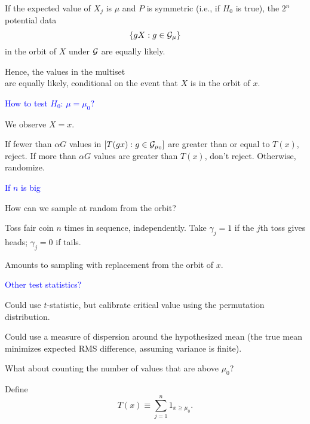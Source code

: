 \documentclass[landscape]{slides}
\newcommand{\cG}{{\cal G}}
\newcommand{\beq}{\begin{equation}}
\newcommand{\eeq}{\end{equation}}
\begin{document}
\begin{slide}

If the expected value of $X_j$ is $\mu$ and $P$ is symmetric (i.e., if $H_0$
is true), 
the $2^n$ potential data
\beq
   \{ gX : g \in \cG_\mu \}
\eeq
in the orbit of $X$ under $\cG$ are equally likely.

Hence, the values in the multiset
\beq
   [ T(gx) : g \in \cG_\mu ]
\eeq
are equally likely, conditional on the event that $X$ is in the orbit of $x$.

\end{slide}

\begin{slide}
{\textcolor{blue}{How to test $H_0$: $\mu = \mu_0$?}}

We observe $X = x$.

If fewer than $\alpha G$ values in $[T(gx) : g \in \cG_{\mu_0}]$ are greater than 
or equal to
$T(x)$, reject.
If more than $\alpha G$ values are greater than $T(x)$, don't reject.
Otherwise, randomize.


\end{slide}

\begin{slide}
{\textcolor{blue}{If $n$ is big \textellipsis}}

How can we sample at random from the orbit?

Toss fair coin $n$ times in sequence, independently.
Take $\gamma_j = 1$ if the $j$th toss gives heads; $\gamma_j = 0$ if tails.

Amounts to sampling with replacement from the orbit of $x$.

\end{slide}


\begin{slide}
{\textcolor{blue}{Other test statistics?}}

Could use $t$-statistic, but calibrate critical value using the permutation distribution.

Could use a measure of dispersion around the hypothesized mean (the
true mean minimizes expected RMS difference, assuming variance is finite).

What about counting the number of values that are above $\mu_0$?

Define 
\beq
   T(x) \equiv \sum_{j=1}^n 1_{x \ge \mu_0}.
\eeq

\end{slide}
\end{document}
